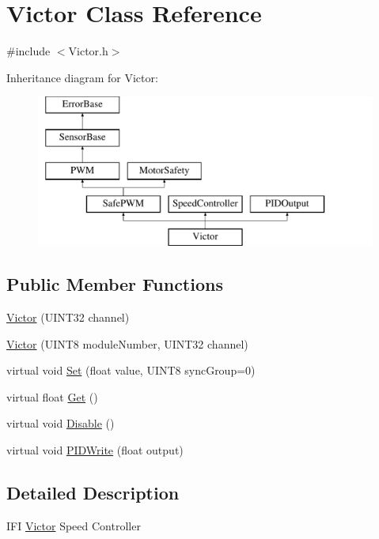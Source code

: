 \hypertarget{classVictor}{
\section{Victor Class Reference}
\label{classVictor}
}


{\ttfamily \#include $<$Victor.h$>$}

Inheritance diagram for Victor:\begin{figure}[H]
\begin{center}
\leavevmode
\includegraphics[height=5.000000cm]{classVictor}
\end{center}
\end{figure}
\subsection*{Public Member Functions}
\begin{DoxyCompactItemize}
\item 
\hyperlink{classVictor_a76d5403d48eba19d889866c240dca391}{Victor} (UINT32 channel)
\item 
\hyperlink{classVictor_ada64e804b34473c6ef78061796c30401}{Victor} (UINT8 moduleNumber, UINT32 channel)
\item 
virtual void \hyperlink{classVictor_aabd64f11a67851b3a4eed9b2ea1016ca}{Set} (float value, UINT8 syncGroup=0)
\item 
virtual float \hyperlink{classVictor_a71f7b8a475186a823515c4508af7498c}{Get} ()
\item 
virtual void \hyperlink{classVictor_a62b0d4aef3b9b749e326532164924a06}{Disable} ()
\item 
virtual void \hyperlink{classVictor_a9b0d32b9299b6525d6450ff88c3365a7}{PIDWrite} (float output)
\end{DoxyCompactItemize}


\subsection{Detailed Description}
IFI \hyperlink{classVictor}{Victor} Speed Controller 

